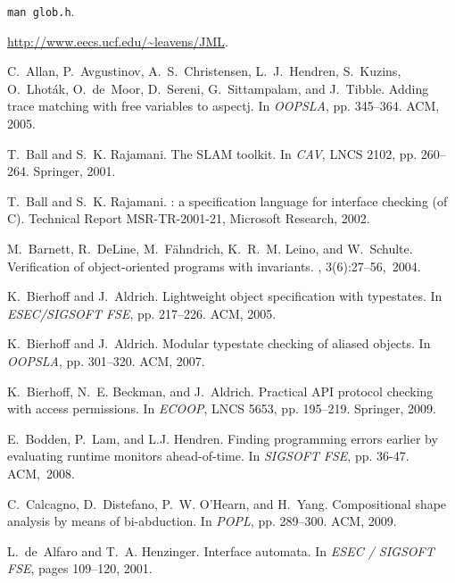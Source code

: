 \documentclass{llncs} %
\begin{document}
\begin{thebibliography}{10}

\texttt{man glob.h}.

\url{http://www.eecs.ucf.edu/~leavens/JML}.

C.~Allan, P.~Avgustinov, A.~S.~Christensen, L.~J.~Hendren,
  S.~Kuzins, O.~Lhot{\'a}k, O.~de~Moor, D.~Sereni, G.~Sittampalam, and J.~Tibble.
\newblock Adding trace matching with free variables to aspectj.
\newblock In {\em OOPSLA}, pp. 345--364. ACM, 2005.

T.~Ball and S.~K. Rajamani.
\newblock The {SLAM} toolkit.
\newblock In  {\em CAV}, LNCS 2102, pp. 260--264. Springer, 2001.

T.~Ball and S.~K. Rajamani.
: a specification language for interface checking (of {C}).
\newblock Technical Report MSR-TR-2001-21, Microsoft Research, 2002.

M.~Barnett, R.~DeLine, M.~F{\"a}hndrich, K.~R.~M. Leino, and
  W.~Schulte.
\newblock Verification of object-oriented programs with invariants.
, 3(6):27--56,~2004.

K.~Bierhoff and J.~Aldrich.
\newblock Lightweight object specification with typestates.
\newblock In {\em ESEC/SIGSOFT FSE}, pp. 217--226. ACM, 2005.

K.~Bierhoff and J.~Aldrich.
\newblock Modular typestate checking of aliased objects.
\newblock In  {\em OOPSLA}, pp. 301--320. ACM, 2007.

K.~Bierhoff, N.~E. Beckman, and J.~Aldrich.
\newblock Practical {API} protocol checking with access permissions.
\newblock In {\em ECOOP}, LNCS 5653, pp. 195--219. Springer, 2009.

E.~Bodden, P.~Lam, and L.J. Hendren.
\newblock Finding programming errors earlier by evaluating runtime monitors
  ahead-of-time.
\newblock In  {\em SIGSOFT FSE}, pp. 36-47. ACM,~2008.

C.~Calcagno, D.~Distefano, P.~W. O'Hearn, and H.~Yang.
\newblock Compositional shape analysis by means of bi-abduction.
\newblock In {\em POPL}, pp. 289--300. ACM, 2009.

L.~de~Alfaro and T.~A. Henzinger.
\newblock Interface automata.
\newblock In {\em ESEC / SIGSOFT FSE}, pages 109--120, 2001.


\end{thebibliography}
\end{document}
